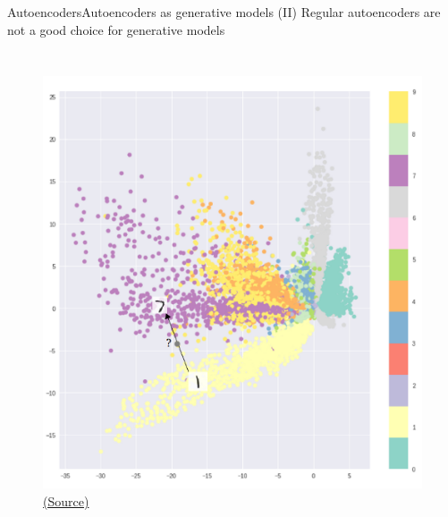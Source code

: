 \documentclass[10pt,compress]{beamer} %
\begin{document}
\begin{frame}{Autoencoders}{Autoencoders as generative models (II)}
	Regular autoencoders are not a good choice for generative models

    \begin{columns}
		\begin{figure}
	        \includegraphics[width=\textwidth]{figs/latent.png}\\
		\scriptsize\href{https://towardsdatascience.com/intuitively-understanding-variational-autoencoders-1bfe67eb5daf}{(Source)}
		\end{figure}
    \end{columns}

\end{frame}
\end{document}
